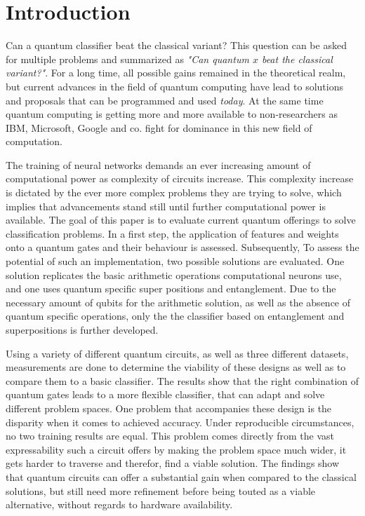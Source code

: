 
\chapter{Introduction} %

\label{chapter:introduction}

Can a quantum classifier beat the classical variant? This question can be asked for multiple problems and summarized as \emph{"Can quantum $x$ beat the classical variant?"}. For a long time, all possible gains remained in the theoretical realm\cite{shor_polynomial-time_1997}, but current advances in the field of quantum computing have lead to solutions and proposals\cite{farhi_quantum_2014, fankhauser_multiple_2021, havlicek_supervised_2019} that can be programmed and used \emph{today}. At the same time quantum computing is getting more and more available to non-researchers as IBM, Microsoft, Google and co. fight for dominance in this new field of computation. \par
The training of neural networks demands an ever increasing amount of computational power\cite{openai_ai_2018} as complexity of circuits increase. This complexity increase is dictated by the ever more complex problems they are trying to solve, which implies that advancements stand still until further computational power is available.  The goal of this paper is to evaluate current quantum offerings to solve classification problems. In a first step, the application of features and weights onto a quantum gates and their behaviour is assessed. Subsequently,  To assess the potential of such an implementation, two possible solutions are evaluated. One solution replicates the basic arithmetic operations computational neurons use, and one uses quantum specific super positions and entanglement. Due to the necessary amount of qubits for the arithmetic solution, as well as the absence of quantum specific operations, only the the classifier based on entanglement and superpositions is further developed.\par 
Using a variety of different quantum circuits, as well as three different datasets, measurements are done to determine the viability of these designs as well as to compare them to a basic  classifier. The results show that the right combination of quantum gates leads to a more flexible classifier, that can adapt and solve different problem spaces. One problem that accompanies these design is the disparity when it comes to achieved accuracy. Under reproducible circumstances, no two training results are equal. This problem comes directly from the vast expressability such a circuit offers \- by making the problem space much wider, it gets harder to traverse and therefor, find a viable solution. The findings show that quantum circuits can offer a substantial gain when compared to the classical solutions, but still need more refinement before being touted as a viable alternative, without regards to hardware availability.